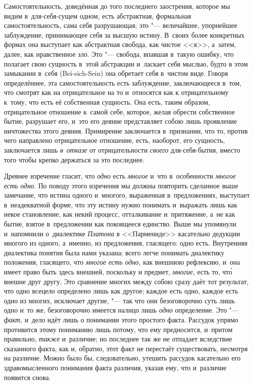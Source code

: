 Самостоятельность, доведённая до того последнего заострения, которое мы
видим в~для-себя-сущем одном, есть абстрактная, формальная
самостоятельность, сама себя разрушающая; это "--- величайшее, упорнейшее
заблуждение, принимающее себя за высшую истину. В~своих более конкретных
формах она выступает как абстрактная свобода, как чистое <<я>>, а~затем,
далее, как нравственное зло. Это "--- свобода, впавшая в~такую ошибку, что
полагает свою сущность в~этой абстракции и~ласкает себя мыслью, будто в
этом замыкании в~себя (Bei-sich-Sein) она обретает себя в~чистом виде.
Говоря определённее, эта самостоятельность есть заблуждение, заключающееся
в~том, что смотрят как на отрицательное на то и~относятся как к
отрицательному к~тому, что есть её собственная сущность. Она есть, таким
образом, отрицательное отношение к~самой себе, которое, желая обрести
собственное бытие, разрушает его, и~это его деяние представляет собою лишь
проявление ничтожества этого деяния. Примирение заключается в~признании,
что то, против чего направлено отрицательное отношение, есть, наоборот, его
сущность, заключается лишь {\em в~отказе} от
отрицательности {\em своего} для-себя-бытия, вместо
того чтобы крепко держаться за это последнее.

Древнее изречение гласит, что {\em одно} есть
{\em многое} и~что в~особенности
{\em многое есть одно}. По поводу этого изречения мы
должны повторить сделанное выше замечание, что истина одного и~многого,
выраженная в~предложениях, выступает в~неадекватной форме, что эту истину
нужно понимать и~выражать лишь как некое становление, как некий процесс,
отталкивание и~притяжение, а~не как бытие, взятое в~предложении как
покоящееся единство. Выше мы упомянули и~напомнили о~диалектике
{\em Платона} в <<Пармениде>> касательно дедукции многого
из одного, а~именно, из предложения, гласящего: одно есть. Внутренняя
диалектика понятия была нами указана; всего легче понимать диалектику
положения, гласящего, что {\em многое есть одно,} как
внешнюю рефлексию, и~она имеет право быть здесь внешней, поскольку и
предмет, {\em многие,} есть то, чт\'{о} внешне друг другу.
Это сравнение многих между собою сразу даёт тот результат, что одно всецело
определено лишь как другое; каждое есть одно, каждое есть одно из многих,
исключает другие, "--- так что они безоговорочно суть лишь одно и~то же,
безоговорочно имеется налицо лишь {\em одно}
определение. Это "--- {\em факт,} и~дело идёт лишь о
понимании этого простого факта. Рассудок упрямо противится этому пониманию
лишь потому, что ему предносится, и~притом правильно,
{\em также} и~различие; но последнее так же не отпадает
вследствие сказанного факта, как и, обратно, этот факт не перестаёт
существовать, несмотря на различие. Можно было бы, следовательно, утешить
рассудок касательно его здравомысленного понимания факта различия, указав
ему, что и~различие появится снова.

